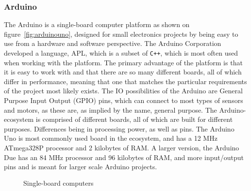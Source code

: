 \subsubsection{Arduino}
The Arduino is a single-board computer platform as shown on figure~\autoref{fig:arduinouno}, designed for small electronics projects by being easy to use from a hardware and software perspective.
The Arduino Corporation developed a language, APL, which is a subset of \texttt{C++}, which is most often used when working with the platform.
The primary advantage of the platform is that it is easy to work with and that there are so many different boards, all of which differ in performance, meaning that one that matches the particular requirements of the project most likely exists.
The IO possibilities of the Arduino are General Purpose Input Output (GPIO) pins, which can connect to most types of sensors and motors, as these are, as implied by the name, general purpose.
The Arduino-ecosystem is comprised of different boards, all of which are built for different purposes.
Differences being in processing power, as well as pins.
The Arduino Uno is most commonly used board in the ecosystem\cite{ArduinoUno3}, and has a 12 MHz ATmega328P processor and 2 kilobytes of RAM.
A larger version, the Arduino Due has an 84 MHz processor and 96 kilobytes of RAM\cite{ArduinoDue}, and more input/output pins and is meant for larger scale Arduino projects.

\begin{figure}[!tbp]
	\centering
	\hfill
	\caption{Single-board computers}
  \end{figure}

